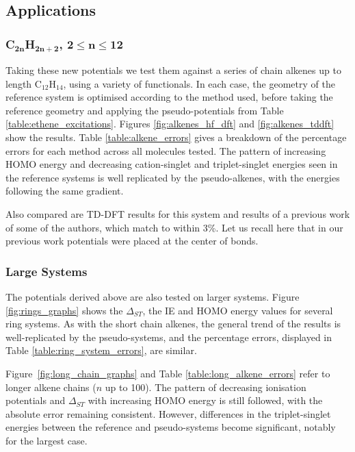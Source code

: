 \documentclass[12pt]{article}
\begin{document}
\subsection*{\sffamily \large Applications}

\subsubsection*{\sffamily \large C\(\mathbf{_{2n}}\)H\(\mathbf{_{2n+2}}\), \(\mathbf{2 \leq n \leq 12}\)}

Taking these new potentials we test them against a series of chain alkenes up to length C\(_{12}\)H\(_{14}\), using a variety of functionals. In each case, the geometry of the reference system is optimised according to the method used, 
before taking the reference geometry and applying the pseudo-potentials from Table \ref{table:ethene_excitations}. 
Figures \ref{fig:alkenes_hf_dft} and \ref{fig:alkenes_tddft} show the results. Table \ref{table:alkene_errors} gives a breakdown of the percentage errors for each method across all molecules tested. The pattern of increasing HOMO energy and decreasing cation-singlet and triplet-singlet energies seen in the reference systems is well replicated by the pseudo-alkenes, with the energies following the same gradient.

Also compared are TD-DFT results for this system and results of a previous work of some of the authors, which match to within 3\%.\cite{drujon_pseudopotentials_2013}
Let us recall here that in our previous work potentials were placed at the center of bonds.

\subsubsection*{\sffamily \large Large Systems}

The potentials derived above are also tested on larger systems.
Figure \ref{fig:rings_graphs} shows the $\Delta_{ST}$, the IE and
HOMO energy values for several ring systems.
As with the short chain alkenes, the general trend of the results is well-replicated
by the pseudo-systems, and the percentage errors, displayed in Table
\ref{table:ring_system_errors}, are similar.

Figure~\ref{fig:long_chain_graphs} and Table \ref{table:long_alkene_errors} refer to longer 
alkene chains (\(n\) up to 100).
The pattern of decreasing ionisation potentials and $\Delta_{ST}$ with increasing HOMO
energy is still followed, with the absolute error remaining consistent.
However, differences in the triplet-singlet energies between the reference and pseudo-systems 
become significant, notably for the largest case.
\end{document}

